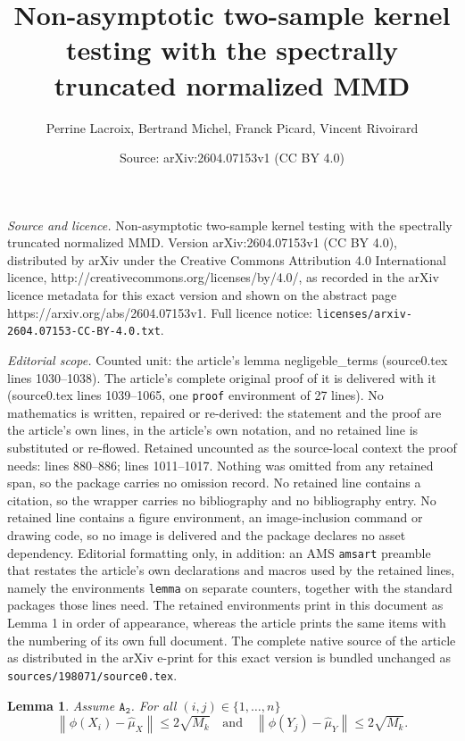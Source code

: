\documentclass[10pt,a4paper]{amsart}
\title{Non-asymptotic two-sample kernel testing with the spectrally truncated normalized MMD}
\author{Perrine Lacroix, Bertrand Michel, Franck Picard, Vincent Rivoirard}
\date{Source: arXiv:2604.07153v1 (CC BY 4.0)}
\newtheorem{lemma}{Lemma}
\newcommand{\A}[1]{$\mathtt{A_#1}$}
\newcommand{\nb}{n}
\begin{document}
\maketitle

\noindent\emph{Source and licence.} Non-asymptotic two-sample kernel testing with the spectrally truncated normalized MMD. Version arXiv:2604.07153v1 (CC BY 4.0), distributed by arXiv under the Creative Commons Attribution 4.0 International licence, http://creativecommons.org/licenses/by/4.0/, as recorded in the arXiv licence metadata for this exact version and shown on the abstract page https://arxiv.org/abs/2604.07153v1. Full licence notice: \texttt{licenses/arxiv-2604.07153-CC-BY-4.0.txt}.\par\smallskip

\noindent\textit{Editorial scope.} Counted unit: the article's lemma negligeble\_terms (source0.tex lines 1030--1038). The article's complete original proof of it is delivered with it (source0.tex lines 1039--1065, one \texttt{proof} environment of 27 lines). No mathematics is written, repaired or re-derived: the statement and the proof are the article's own lines, in the article's own notation, and no retained line is substituted or re-flowed.  Retained uncounted as the source-local context the proof needs: lines 880--886; lines 1011--1017.  Nothing was omitted from any retained span, so the package carries no omission record.  No retained line contains a citation, so the wrapper carries no bibliography and no bibliography entry.  No retained line contains a figure environment, an image-inclusion command or drawing code, so no image is delivered and the package declares no asset dependency.  Editorial formatting only, in addition: an AMS \texttt{amsart} preamble that restates the article's own declarations and macros used by the retained lines, namely the environments \texttt{lemma} on separate counters, together with the standard packages those lines need.  The retained environments print in this document as Lemma 1 in order of appearance, whereas the article prints the same items with the numbering of its own full document.  The complete native source of the article as distributed in the arXiv e-print for this exact version is bundled unchanged as \texttt{sources/198071/source0.tex}.
\begin{lemma}
\label{bound_kernel}
Assume \A{2}. For all $(i,j) \in \{1,\ldots,\nb\}$ 
    \begin{equation*}
         \left \| \phi(X_i) - \widehat{\mu}_X \right \| \leq  2 \sqrt{M_k}  \quad \text{and} \quad \left \| \phi(Y_j) - \widehat{\mu}_Y \right \| \leq  2 \sqrt{M_k} .
   \end{equation*}
\end{lemma}
\end{document}
